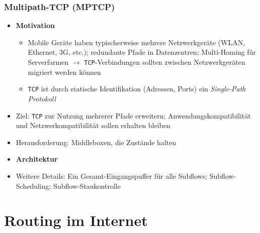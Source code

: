 \subsubsection{Multipath-TCP (MPTCP)}
\begin{itemize}
	\item \textbf{Motivation}
	\begin{itemize}
		\item Mobile Geräte haben typischerweise mehrere Netzwerkgeräte (WLAN, Ethernet, 3G, etc.); redundante Pfade in Datenzentren; Multi-Homing für Serverfarmen \(\rightarrow\) \texttt{TCP}-Verbindungen sollten zwischen Netzwerkgeräten migriert werden können
		\item \texttt{TCP} ist durch statische Identifikation (Adressen, Ports) ein \textit{Single-Path Protokoll}
	\end{itemize}
	\item Ziel: \texttt{TCP} zur Nutzung mehrerer Pfade erweitern; Anwendungskompatibilität und Netzwerkompatibilität sollen erhalten bleiben
	\item Herausforderung: Middleboxen, die Zustände halten
	\item \textbf{Architektur}
	\item Weitere Details: Ein Gesamt-Eingangspuffer für alle Subflows; Subflow-Scheduling; Subflow-Staukontrolle
\end{itemize}



\section{Routing im Internet}

